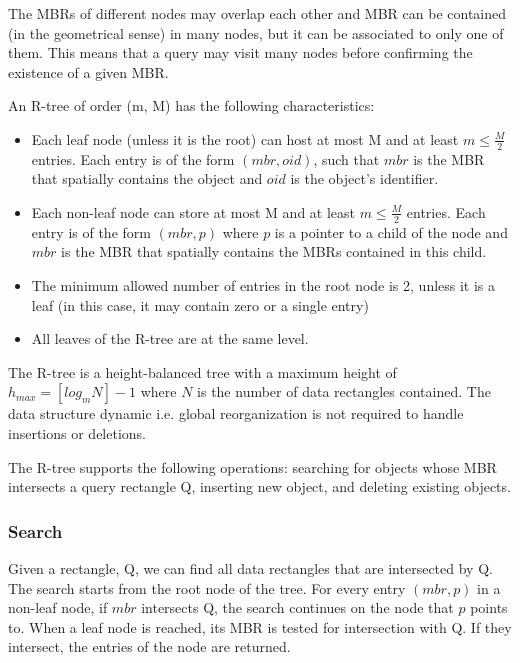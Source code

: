 \documentclass[11pt, a4paper, oneside]{article}
\begin{document}
The MBRs of different nodes may overlap each other and MBR can be contained (in the geometrical sense) in many nodes, but it can be associated to only one of them. This means that a query may visit many nodes before confirming the existence of a given MBR.

An R-tree of order (m, M) has the following characteristics:
\begin{itemize}
\item Each leaf node (unless it is the root) can host at most M and at least $m\leq \frac{M}{2}$ entries. Each entry is of the form $(mbr, oid)$, such that $mbr$ is the MBR that spatially contains the object and $oid$ is the object's identifier.
\item Each non-leaf node can store at most M and at least $m\leq \frac{M}{2}$ entries. Each entry is of the form $(mbr, p)$ where $p$ is a pointer to a child of the node and $mbr$ is the MBR that spatially contains the MBRs contained in this child.
\item The minimum allowed number of entries in the root node is 2, unless it is a leaf (in this case, it may contain zero or a single entry)
\item All leaves of the R-tree are at the same level.
\end{itemize}

The R-tree is a height-balanced tree with a maximum height of $h_{max}=[log_mN]-1$ where $N$ is the number of data rectangles contained. The data structure dynamic i.e. global reorganization is not required to handle insertions or deletions. 

The R-tree supports the following operations: searching for objects whose MBR intersects a query rectangle Q, inserting new object, and deleting existing objects.

\subsubsection*{Search}
Given a rectangle, Q, we can find all data rectangles that are intersected by Q. The search starts from the root node of the tree. For every entry $(mbr, p)$ in a non-leaf node, if $mbr$ intersects Q, the search continues on the node that $p$ points to. When a leaf node is reached, its MBR is tested for intersection with Q. If they intersect, the entries of the node are returned. 
\end{document}
